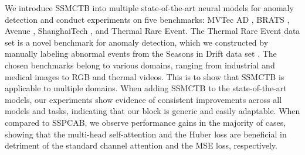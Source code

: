\documentclass[10pt,journal,compsoc]{IEEEtran}
\begin{document}
We introduce SSMCTB into multiple state-of-the-art neural models \cite{Barbalau-ARXIV-2022, Zavrtanik-ICCV-2021, Schulter-ECCV-2022, Georgescu-TPAMI-2021, Liu-ICCV-2021, Park-CVPR-2020, Liu-CVPR-2018, He-CVPR-2022,Vasu-ICCV-2023,Wang-ICDM-2022} for anomaly detection and conduct experiments on five benchmarks: MVTec AD \cite{Bergmann-CVPR-2019}, BRATS \cite{Menze-TMI-2015}, Avenue \cite{Lu-ICCV-2013}, ShanghaiTech \cite{Luo-ICCV-2017}, and Thermal Rare Event. The Thermal Rare Event data set is a novel benchmark for anomaly detection, which we constructed by manually labeling abnormal events from the Seasons in Drift data set \cite{Nikolov-NIPS-2021}. The chosen benchmarks belong to various domains, ranging from industrial and medical images to RGB and thermal videos. This is to show that SSMCTB is applicable to multiple domains. When adding SSMCTB to the state-of-the-art models, our experiments show evidence of consistent improvements across all models and tasks, indicating that our block is generic and easily adaptable. When compared to SSPCAB, we observe performance gains in the majority of cases, showing that the multi-head self-attention and the Huber loss are beneficial in detriment of the standard channel attention \cite{Hu-CVPR-2018} and the MSE loss, respectively.
\end{document}
